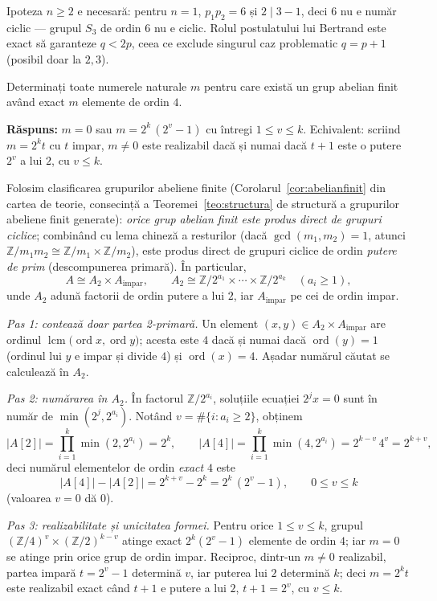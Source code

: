\begin{obs}
Ipoteza $n\ge 2$ e necesară: pentru $n=1$, $p_{1}p_{2}=6$ și
$2\mid 3-1$, deci $6$ nu e număr ciclic --- grupul $S_{3}$ de ordin $6$ nu
e ciclic. Rolul postulatului lui Bertrand este exact să garanteze
$q<2p$, ceea ce exclude singurul caz problematic $q=p+1$ (posibil doar la
$2,3$).
\end{obs}

\begin{problema}
Determinați toate numerele naturale $m$ pentru care există un grup
abelian finit având exact $m$ elemente de ordin $4$.
\end{problema}

\noindent\textbf{Răspuns:} $m=0$ sau $m=2^{k}\,(2^{v}-1)$ cu întregi
$1\le v\le k$. Echivalent: scriind $m=2^{k}t$ cu $t$ impar, $m\neq 0$ este
realizabil dacă și numai dacă $t+1$ este o putere $2^{v}$ a lui
$2$, cu $v\le k$.

\begin{solutie}
Folosim clasificarea grupurilor abeliene finite (Corolarul~\ref{cor:abelianfinit} din cartea
de teorie, consecință a Teoremei~\ref{teo:structura} de structură a grupurilor
abeliene finit generate): \emph{orice grup abelian finit este produs direct
de grupuri ciclice}; combinând cu lema chineză a resturilor
(dacă $\gcd(m_1,m_2)=1$, atunci
$\mathbb{Z}/m_1m_2\cong\mathbb{Z}/m_1\times\mathbb{Z}/m_2$), este
produs direct de grupuri ciclice de ordin \emph{putere de prim}
(descompunerea primară). În particular,
\[
  A\cong A_{2}\times A_{\text{impar}},\qquad
  A_{2}\cong \mathbb{Z}/2^{a_{1}}\times\cdots\times\mathbb{Z}/2^{a_{k}}
  \quad(a_{i}\ge 1),
\]
unde $A_{2}$ adună factorii de ordin putere a lui $2$, iar
$A_{\text{impar}}$ pe cei de ordin impar.

\smallskip
\textit{Pas 1: contează doar partea 2-primară.} Un element
$(x,y)\in A_{2}\times A_{\text{impar}}$ are ordinul
$\operatorname{lcm}\bigl(\operatorname{ord}x,\operatorname{ord}y\bigr)$;
acesta este $4$ dacă și numai dacă $\operatorname{ord}(y)=1$
(ordinul lui $y$ e impar și divide $4$) și $\operatorname{ord}(x)=4$.
Așadar numărul căutat se calculează în $A_{2}$.

\smallskip
\textit{Pas 2: numărarea în $A_{2}$.} În factorul
$\mathbb{Z}/2^{a_{i}}$, soluțiile ecuației $2^{j}x=0$ sunt în
număr de $\min(2^{j},2^{a_{i}})$. Notând
$v=\#\{i:a_{i}\ge 2\}$, obținem
\[
  \bigl|A[2]\bigr|=\prod_{i=1}^{k}\min(2,2^{a_{i}})=2^{k},\qquad
  \bigl|A[4]\bigr|=\prod_{i=1}^{k}\min(4,2^{a_{i}})=2^{k-v}\,4^{v}=2^{k+v},
\]
deci numărul elementelor de ordin \emph{exact} $4$ este
\[
  \bigl|A[4]\bigr|-\bigl|A[2]\bigr|=2^{k+v}-2^{k}=2^{k}\,(2^{v}-1),
  \qquad 0\le v\le k
\]
(valoarea $v=0$ dă $0$).

\smallskip
\textit{Pas 3: realizabilitate și unicitatea formei.} Pentru orice
$1\le v\le k$, grupul $(\mathbb{Z}/4)^{v}\times(\mathbb{Z}/2)^{k-v}$ atinge
exact $2^{k}(2^{v}-1)$ elemente de ordin $4$; iar $m=0$ se atinge prin orice
grup de ordin impar. Reciproc, dintr-un $m\neq 0$ realizabil, partea impară
$t=2^{v}-1$ determină $v$, iar puterea lui $2$ determină $k$; deci
$m=2^{k}t$ este realizabil exact când $t+1$ e putere a lui $2$, $t+1=2^{v}$,
cu $v\le k$.
\end{solutie}

